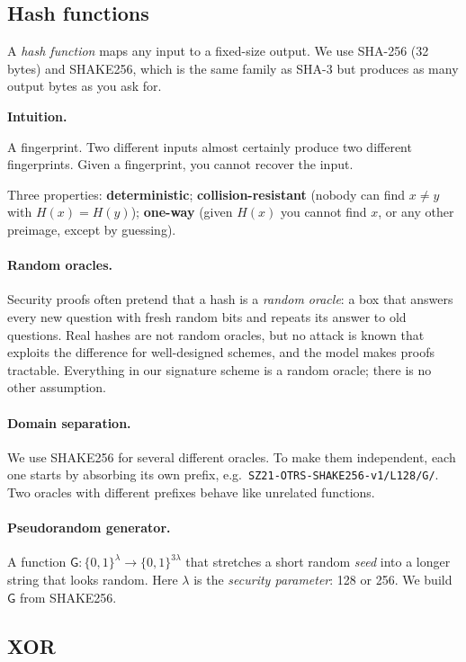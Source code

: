 \documentclass[11pt,a4paper]{article}
\newcommand{\bits}{\{0,1\}}
\newcommand{\Gf}{\mathsf{G}}
\newenvironment{intuition}[1][Intuition]{%
  \def\FrameCommand{\fboxsep=8pt\fcolorbox{boxrule}{boxbg}}%
  \MakeFramed{\advance\hsize-2\fboxsep\FrameRestore}%
  \noindent\textbf{#1.}\par\smallskip%
  \itshape
}{\endMakeFramed}
\theoremstyle{definition}
\begin{document}
\subsection{Hash functions}

A \emph{hash function} maps any input to a fixed-size output. We use
SHA-256 (32 bytes) and SHAKE256, which is the same family as SHA-3 but
produces as many output bytes as you ask for.

\begin{intuition}
A fingerprint. Two different inputs almost certainly produce two
different fingerprints. Given a fingerprint, you cannot recover the input.
\end{intuition}

\noindent
Three properties: \textbf{deterministic}; \textbf{collision-resistant}
(nobody can find $x \ne y$ with $H(x) = H(y)$); \textbf{one-way} (given
$H(x)$ you cannot find $x$, or any other preimage, except by guessing).

\paragraph{Random oracles.} Security proofs often pretend that a hash is a
\emph{random oracle}: a box that answers every new question with fresh
random bits and repeats its answer to old questions. Real hashes are not
random oracles, but no attack is known that exploits the difference for
well-designed schemes, and the model makes proofs tractable.
Everything in our signature scheme is a random oracle; there is no other
assumption.

\paragraph{Domain separation.} We use SHAKE256 for several different
oracles. To make them independent, each one starts by absorbing its own
prefix, e.g.\ \texttt{SZ21-OTRS-SHAKE256-v1/L128/G/}. Two oracles with
different prefixes behave like unrelated functions.

\paragraph{Pseudorandom generator.} A function $\Gf : \bits^\lambda \to
\bits^{3\lambda}$ that stretches a short random \emph{seed} into a longer
string that looks random. Here $\lambda$ is the \emph{security parameter}:
128 or 256. We build $\Gf$ from SHAKE256.

\subsection{XOR}
\end{document}
